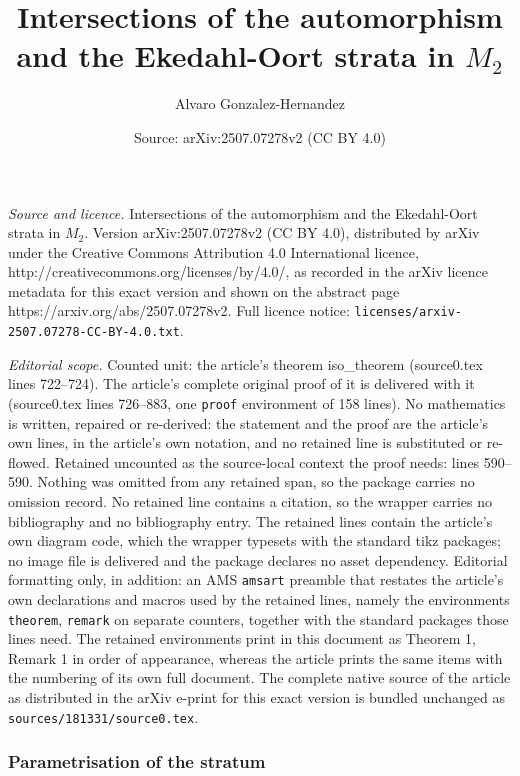 \documentclass[10pt,a4paper]{amsart}
\title{Intersections of the automorphism and the Ekedahl-Oort strata in $M_2$}
\author{Alvaro Gonzalez-Hernandez}
\date{Source: arXiv:2507.07278v2 (CC BY 4.0)}
\begin{document}
\maketitle

\noindent\emph{Source and licence.} Intersections of the automorphism and the Ekedahl-Oort strata in $M_2$. Version arXiv:2507.07278v2 (CC BY 4.0), distributed by arXiv under the Creative Commons Attribution 4.0 International licence, http://creativecommons.org/licenses/by/4.0/, as recorded in the arXiv licence metadata for this exact version and shown on the abstract page https://arxiv.org/abs/2507.07278v2. Full licence notice: \texttt{licenses/arxiv-2507.07278-CC-BY-4.0.txt}.\par\smallskip

\noindent\textit{Editorial scope.} Counted unit: the article's theorem iso\_theorem (source0.tex lines 722--724). The article's complete original proof of it is delivered with it (source0.tex lines 726--883, one \texttt{proof} environment of 158 lines). No mathematics is written, repaired or re-derived: the statement and the proof are the article's own lines, in the article's own notation, and no retained line is substituted or re-flowed.  Retained uncounted as the source-local context the proof needs: lines 590--590.  Nothing was omitted from any retained span, so the package carries no omission record.  No retained line contains a citation, so the wrapper carries no bibliography and no bibliography entry.  The retained lines contain the article's own diagram code, which the wrapper typesets with the standard tikz packages; no image file is delivered and the package declares no asset dependency.  Editorial formatting only, in addition: an AMS \texttt{amsart} preamble that restates the article's own declarations and macros used by the retained lines, namely the environments \texttt{theorem}, \texttt{remark} on separate counters, together with the standard packages those lines need.  The retained environments print in this document as Theorem 1, Remark 1 in order of appearance, whereas the article prints the same items with the numbering of its own full document.  The complete native source of the article as distributed in the arXiv e-print for this exact version is bundled unchanged as \texttt{sources/181331/source0.tex}.
\subsubsection{Parametrisation of the stratum} \label{par_subsection}
\end{document}
